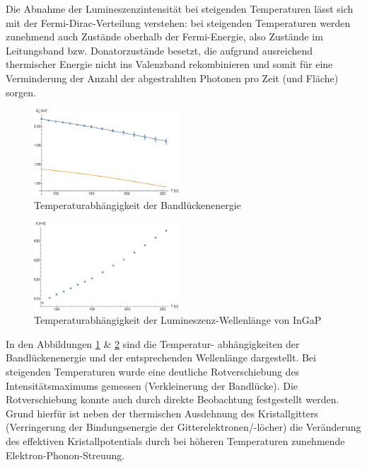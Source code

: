 \documentclass[aps,twocolumn,secnumarabic,nobalancelastpage,amsmath,amssymb,
nofootinbib,superscriptaddress]{revtex4-1}
\begin{document}
Die Abnahme der Lumineszenzintensität bei steigenden Temperaturen lässt sich mit der Fermi-Dirac-Verteilung
verstehen: bei steigenden Temperaturen werden zunehmend auch Zustände oberhalb der Fermi-Energie, also Zustände
im Leitungsband bzw. Donatorzustände besetzt, die aufgrund ausreichend thermischer Energie nicht ins Valenzband
rekombinieren und somit für eine Verminderung der Anzahl der abgestrahlten Photonen pro Zeit (und Fläche) sorgen.

\begin{figure}[t]
  \centering
  \includegraphics[width=0.48\textwidth]{../Messung/energtemp.eps}
  \caption{\label{fig:EgapT} Temperaturabhängigkeit der Bandlückenenergie}
\end{figure}

\begin{figure}[b]
  \centering
  \includegraphics[width=0.48\textwidth]{../Messung/peaktemp.eps}
  \caption{\label{fig:lamT} Temperaturabhängigkeit der Lumineszenz-Wellenlänge von InGaP}
\end{figure}

\newline\vspace{1em}
\noindent In den Abbildungen \ref{fig:EgapT} \& \ref{fig:lamT} sind die Temperatur-
abhängigkeiten der Bandlückenenergie und der entsprechenden Wellenlänge dargestellt. Bei steigenden Temperaturen wurde eine deutliche
Rotverschiebung des Intensitätsmaximums gemessen (Verkleinerung der Bandlücke). Die Rotverschiebung konnte auch durch
direkte Beobachtung festgestellt werden. Grund hierfür ist neben der thermischen Ausdehnung des Kristallgitters (Verringerung
der Bindungsenergie der Gitterelektronen/-löcher) die Veränderung des effektiven Kristallpotentials durch bei höheren Temperaturen
zunehmende Elektron-Phonon-Streuung. \cite{kittel}
\end{document}
